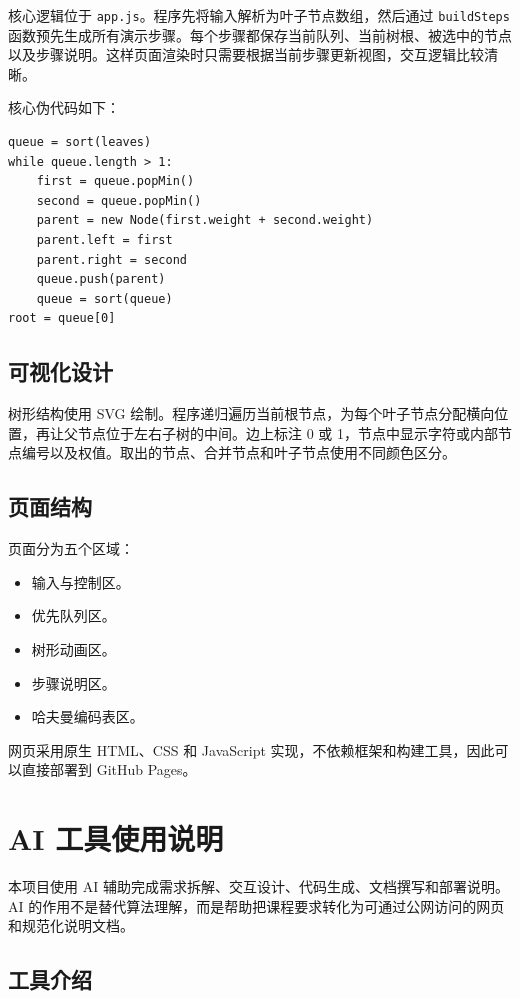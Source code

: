 \documentclass[UTF8,a4paper,12pt]{ctexart}
\begin{document}
核心逻辑位于 \texttt{app.js}。程序先将输入解析为叶子节点数组，然后通过 \texttt{buildSteps} 函数预先生成所有演示步骤。每个步骤都保存当前队列、当前树根、被选中的节点以及步骤说明。这样页面渲染时只需要根据当前步骤更新视图，交互逻辑比较清晰。

核心伪代码如下：

\begin{lstlisting}
queue = sort(leaves)
while queue.length > 1:
    first = queue.popMin()
    second = queue.popMin()
    parent = new Node(first.weight + second.weight)
    parent.left = first
    parent.right = second
    queue.push(parent)
    queue = sort(queue)
root = queue[0]
\end{lstlisting}

\subsection{可视化设计}

树形结构使用 SVG 绘制。程序递归遍历当前根节点，为每个叶子节点分配横向位置，再让父节点位于左右子树的中间。边上标注 0 或 1，节点中显示字符或内部节点编号以及权值。取出的节点、合并节点和叶子节点使用不同颜色区分。

\subsection{页面结构}

页面分为五个区域：

\begin{itemize}
  \item 输入与控制区。
  \item 优先队列区。
  \item 树形动画区。
  \item 步骤说明区。
  \item 哈夫曼编码表区。
\end{itemize}

网页采用原生 HTML、CSS 和 JavaScript 实现，不依赖框架和构建工具，因此可以直接部署到 GitHub Pages。

\section{AI 工具使用说明}

本项目使用 AI 辅助完成需求拆解、交互设计、代码生成、文档撰写和部署说明。AI 的作用不是替代算法理解，而是帮助把课程要求转化为可通过公网访问的网页和规范化说明文档。

\subsection{工具介绍}
\end{document}
